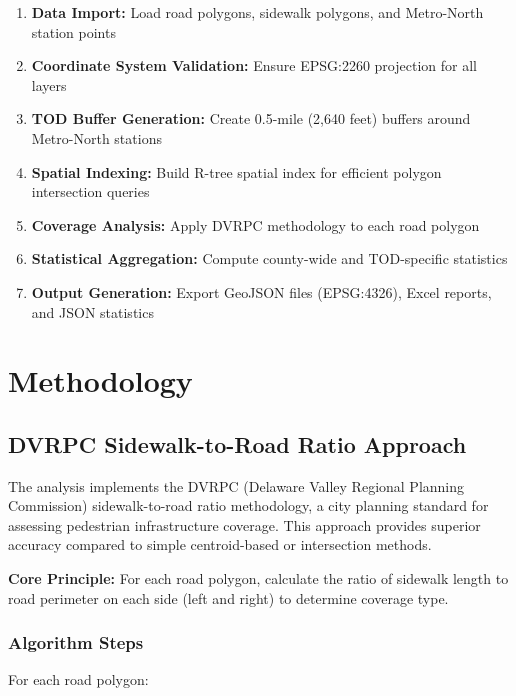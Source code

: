 \documentclass[11pt,letterpaper]{article}
\begin{document}
\begin{enumerate}
    \item \textbf{Data Import:} Load road polygons, sidewalk polygons, and Metro-North station points
    \item \textbf{Coordinate System Validation:} Ensure EPSG:2260 projection for all layers
    \item \textbf{TOD Buffer Generation:} Create 0.5-mile (2,640 feet) buffers around Metro-North stations
    \item \textbf{Spatial Indexing:} Build R-tree spatial index for efficient polygon intersection queries
    \item \textbf{Coverage Analysis:} Apply DVRPC methodology to each road polygon
    \item \textbf{Statistical Aggregation:} Compute county-wide and TOD-specific statistics
    \item \textbf{Output Generation:} Export GeoJSON files (EPSG:4326), Excel reports, and JSON statistics
\end{enumerate}

\section{Methodology}

\subsection{DVRPC Sidewalk-to-Road Ratio Approach}

The analysis implements the DVRPC (Delaware Valley Regional Planning Commission) sidewalk-to-road ratio methodology, a city planning standard for assessing pedestrian infrastructure coverage. This approach provides superior accuracy compared to simple centroid-based or intersection methods.

\textbf{Core Principle:} For each road polygon, calculate the ratio of sidewalk length to road perimeter on each side (left and right) to determine coverage type.

\subsubsection{Algorithm Steps}

For each road polygon:
\end{document}
